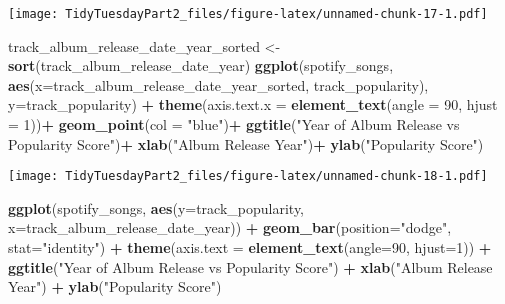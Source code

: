 \documentclass[
]{article}
\newenvironment{Shaded}{\begin{snugshade}}{\end{snugshade}}
\newcommand{\DataTypeTok}[1]{\textcolor[rgb]{0.13,0.29,0.53}{#1}}
\newcommand{\DecValTok}[1]{\textcolor[rgb]{0.00,0.00,0.81}{#1}}
\newcommand{\KeywordTok}[1]{\textcolor[rgb]{0.13,0.29,0.53}{\textbf{#1}}}
\newcommand{\NormalTok}[1]{#1}
\newcommand{\OperatorTok}[1]{\textcolor[rgb]{0.81,0.36,0.00}{\textbf{#1}}}
\newcommand{\StringTok}[1]{\textcolor[rgb]{0.31,0.60,0.02}{#1}}
\begin{document}
\texttt{[image: TidyTuesdayPart2\_files/figure-latex/unnamed-chunk-17-1.pdf]}

\begin{Shaded}
\begin{Highlighting}[]
\NormalTok{track_album_release_date_year_sorted <-}\StringTok{ }\KeywordTok{sort}\NormalTok{(track_album_release_date_year)}
\KeywordTok{ggplot}\NormalTok{(spotify_songs, }\KeywordTok{aes}\NormalTok{(}\DataTypeTok{x=}\NormalTok{track_album_release_date_year_sorted, }
\NormalTok{                          track_popularity), }\DataTypeTok{y=}\NormalTok{track_popularity) }\OperatorTok{+}\StringTok{  }
\StringTok{  }\KeywordTok{theme}\NormalTok{(}\DataTypeTok{axis.text.x =} \KeywordTok{element_text}\NormalTok{(}\DataTypeTok{angle =} \DecValTok{90}\NormalTok{, }\DataTypeTok{hjust =} \DecValTok{1}\NormalTok{))}\OperatorTok{+}
\StringTok{  }\KeywordTok{geom_point}\NormalTok{(}\DataTypeTok{col =} \StringTok{"blue"}\NormalTok{)}\OperatorTok{+}
\StringTok{  }\KeywordTok{ggtitle}\NormalTok{(}\StringTok{"Year of Album Release vs Popularity Score"}\NormalTok{)}\OperatorTok{+}
\StringTok{  }\KeywordTok{xlab}\NormalTok{(}\StringTok{"Album Release Year"}\NormalTok{)}\OperatorTok{+}
\StringTok{  }\KeywordTok{ylab}\NormalTok{(}\StringTok{"Popularity Score"}\NormalTok{)}
\end{Highlighting}
\end{Shaded}

\texttt{[image: TidyTuesdayPart2\_files/figure-latex/unnamed-chunk-18-1.pdf]}

\begin{Shaded}
\begin{Highlighting}[]
\KeywordTok{ggplot}\NormalTok{(spotify_songs, }\KeywordTok{aes}\NormalTok{(}\DataTypeTok{y=}\NormalTok{track_popularity, }
                          \DataTypeTok{x=}\NormalTok{track_album_release_date_year)) }\OperatorTok{+}\StringTok{ }
\StringTok{  }\KeywordTok{geom_bar}\NormalTok{(}\DataTypeTok{position=}\StringTok{"dodge"}\NormalTok{, }\DataTypeTok{stat=}\StringTok{"identity"}\NormalTok{) }\OperatorTok{+}\StringTok{ }
\StringTok{  }\KeywordTok{theme}\NormalTok{(}\DataTypeTok{axis.text =} \KeywordTok{element_text}\NormalTok{(}\DataTypeTok{angle=}\DecValTok{90}\NormalTok{, }\DataTypeTok{hjust=}\DecValTok{1}\NormalTok{)) }\OperatorTok{+}\StringTok{ }
\StringTok{  }\KeywordTok{ggtitle}\NormalTok{(}\StringTok{"Year of Album Release vs Popularity Score"}\NormalTok{) }\OperatorTok{+}\StringTok{ }
\StringTok{  }\KeywordTok{xlab}\NormalTok{(}\StringTok{"Album Release Year"}\NormalTok{) }\OperatorTok{+}\StringTok{ }\KeywordTok{ylab}\NormalTok{(}\StringTok{"Popularity Score"}\NormalTok{)}
\end{Highlighting}
\end{Shaded}
\end{document}
